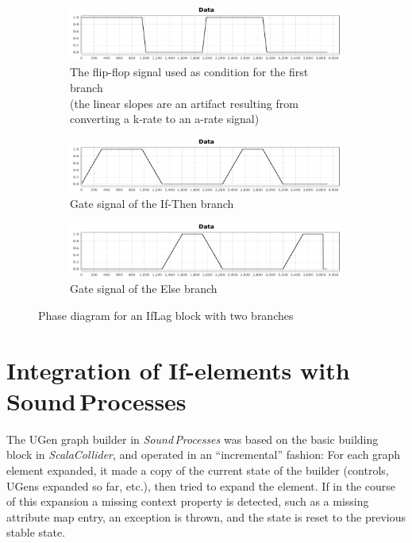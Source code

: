 \documentclass[11pt,a4paper]{article}
\newcommand{\software}[1]{\textit{#1}}
\begin{document}
\begin{figure}
\centering
\begin{subfigure}[b]{1.0\textwidth}%
\includegraphics[width=\textwidth,trim=0 0 25mm 8mm,clip]{figures/iflag-cond-1.pdf}
\caption{The flip-flop signal used as condition for the first branch \\\phantom{(a) }(the linear slopes are an artifact resulting from converting a k-rate to an a-rate signal)}\label{fig:iflag-cond-1}
\end{subfigure}
\begin{subfigure}[b]{1.0\textwidth}%
\includegraphics[width=\textwidth,trim=0 0 25mm 8mm,clip]{figures/iflag-gate-1.pdf}
\caption{Gate signal of the If-Then branch}\label{fig:iflag-gate-1}
\end{subfigure}
\begin{subfigure}[b]{1.0\textwidth}%
\includegraphics[width=\textwidth,trim=0 0 25mm 8mm,clip]{figures/iflag-gate-2.pdf}
\caption{Gate signal of the Else branch}\label{fig:iflag-gate-1}
\end{subfigure}
\caption{Phase diagram for an IfLag block with two branches}
\label{fig:iflag-gate}
\end{figure}

\section{Integration of If-elements with Sound\,Processes}

The UGen graph builder in \software{Sound\,Processes} was based on the basic building block in \software{ScalaCollider}, and operated in an ``incremental'' fashion: For each graph element expanded, it made a copy of the current state of the builder (controls, UGens expanded so far, etc.), then tried to expand the element. If in the course of this expansion a missing context property is detected, such as a missing attribute map entry, an exception is thrown, and the state is reset to the previous stable state.
\end{document}
